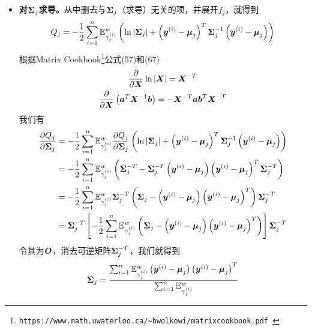 \documentclass[a4paper,UTF8]{article}
\begin{document}
\begin{itemize}
\item \textbf{ 对\(\boldsymbol{\Sigma}_j\)求导。}从中删去与\(\boldsymbol{\Sigma}_j\)（求导）无关的项，并展开\(f_j\)，就得到\begin{equation*}
    Q_j=-\frac{1}{2}\sum_{i=1}^n\mathbb{E}_{\gamma_j^{(i)}}^w\left(
        \ln|\boldsymbol{\Sigma}_j|+\left(
            \boldsymbol{y}^{(i)}-\boldsymbol{\mu}_j
        \right)^T\boldsymbol{\Sigma}_j^{-1}\left(
            \boldsymbol{y}^{(i)}-\boldsymbol{\mu}_j
        \right)
    \right)
\end{equation*}根据{\sc Matrix Cookbook}\footnote{
   \tt https://www.math.uwaterloo.ca/\textasciitilde hwolkowi/matrixcookbook.pdf
}公式(57)和(67)\begin{gather}
    \frac{\partial}{\partial\boldsymbol{X}}\ln|\boldsymbol{X}|=\boldsymbol{X}^{-T}\\
    \frac{\partial}{\partial\boldsymbol{X}}\left(\boldsymbol{a}^T\boldsymbol{X}^{-1}\boldsymbol{b}\right)=-\boldsymbol{X}^{-T}\boldsymbol{a}\boldsymbol{b}^T\boldsymbol{X}^{-T}
\end{gather}我们有\begin{equation}
    \begin{split}
        \frac{\partial Q_j}{\partial\boldsymbol{\Sigma}_j}
        &=-\frac{1}{2}\sum_{i=1}^n\mathbb{E}_{\gamma_j^{(i)}}^w \frac{\partial Q_j}{\partial\boldsymbol{\Sigma}_j}\left(
            \ln|\boldsymbol{\Sigma}_j|+\left(
                \boldsymbol{y}^{(i)}-\boldsymbol{\mu}_j
            \right)^T\boldsymbol{\Sigma}_j^{-1}\left(
                \boldsymbol{y}^{(i)}-\boldsymbol{\mu}_j
            \right)
        \right)\\
        &=-\frac{1}{2}\sum_{i=1}^n\mathbb{E}_{\gamma_j^{(i)}}^w
            \left(
                \boldsymbol{\Sigma}_j^{-T}-\boldsymbol{\Sigma}_j^{-T}\left(
                    \boldsymbol{y}^{(i)}-\boldsymbol{\mu}_j
                \right)\left(
                    \boldsymbol{y}^{(i)}-\boldsymbol{\mu}_j
                \right)^T\boldsymbol{\Sigma}_j^{-T}
            \right)\\
        &=-\frac{1}{2}\sum_{i=1}^n\mathbb{E}_{\gamma_j^{(i)}}^w
            \boldsymbol{\Sigma}_j^{-T}\left(
                \boldsymbol{\Sigma}_j-\left(
                    \boldsymbol{y}^{(i)}-\boldsymbol{\mu}_j
                \right)\left(
                    \boldsymbol{y}^{(i)}-\boldsymbol{\mu}_j
                \right)^T
            \right)\boldsymbol{\Sigma}_j^{-T}\\
        &=\boldsymbol{\Sigma}_j^{-T}\left[-\frac{1}{2}\sum_{i=1}^n\mathbb{E}_{\gamma_j^{(i)}}^w\left(
            \boldsymbol{\Sigma}_j-\left(
                \boldsymbol{y}^{(i)}-\boldsymbol{\mu}_j
            \right)\left(
                \boldsymbol{y}^{(i)}-\boldsymbol{\mu}_j
            \right)^T
        \right)\right]\boldsymbol{\Sigma}_j^{-T}
    \end{split}
\end{equation}令其为\(\boldsymbol{O}\)，消去可逆矩阵\(\boldsymbol{\Sigma}_j^{-T}\)，我们就得到\begin{equation}
    \boldsymbol{\Sigma}_j=\frac{
        \sum_{i=1}^n\mathbb{E}_{\gamma_j^{(i)}}^w
            \left(
                \boldsymbol{y}^{(i)}-\boldsymbol{\mu}_j
            \right)\left(
                \boldsymbol{y}^{(i)}-\boldsymbol{\mu}_j
            \right)^T
    }{
        \sum_{i=1}^n\mathbb{E}_{\gamma_j^{(i)}}^w
    }
\end{equation}
\end{itemize}
\end{document}
